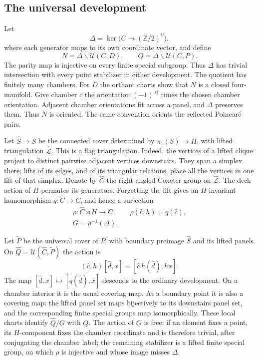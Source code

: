 \documentclass[11pt]{article}
\theoremstyle{definition}
\theoremstyle{remark}
\newcommand{\Z}{\mathbb Z}
\begin{document}
\subsection{The universal development}
\label{rf:universal}

Let
\[
 \Delta=\ker\bigl(C\longrightarrow(\Z/2)^V\bigr),
\]
where each generator maps to its own coordinate vector, and define
\[
 N=\Delta\backslash\mathcal U(C,D),\qquad
 Q=\Delta\backslash\mathcal U(C,P).
\]
The parity map is injective on every finite special subgroup.
Thus $\Delta$ has trivial intersection with every point stabilizer
in either development.  The quotient has finitely many chambers.
For $D$ the orthant charts show that $N$ is a closed four-manifold.
Give chamber $c$ the orientation $(-1)^{|c|}$ times the chosen chamber
orientation.  Adjacent chamber orientations fit across a panel, and
$\Delta$ preserves them.  Thus $N$ is oriented.  The same convention
orients the reflected Poincar\'e pairs.

Let $\widehat S\to S$ be the connected cover determined by
$\pi_1(S)\to H$, with lifted triangulation $\widehat{\mathcal L}$.
This is a flag triangulation.  Indeed, the vertices of a lifted clique
project to distinct pairwise adjacent vertices downstairs.  They span
a simplex there; lifts of its edges, and of its triangular relations,
place all the vertices in one lift of that simplex.  Denote by
$\widehat C$ the right-angled Coxeter group on
$\widehat{\mathcal L}$.  The deck action of $H$ permutes its generators.
Forgetting the lift gives an $H$-invariant homomorphism
$q:\widehat C\to C$, and hence a surjection
\begin{equation}
 \label{rf:group}
 \begin{gathered}
 \rho:\widehat C\rtimes H\longrightarrow C,
 \qquad \rho(\widehat c,h)=q(\widehat c),\\
 G=\rho^{-1}(\Delta).
 \end{gathered}
\end{equation}

Let $\widetilde P$ be the universal cover of $P$, with boundary
preimage $\widehat S$ and its lifted panels.  On
$\widehat Q=\mathcal U(\widehat C,\widetilde P)$ the action is
\[
 (\widehat c,h)[\widehat d,x]
     =[\widehat c\,h(\widehat d),hx].
\]
The map $[\widehat d,x]\mapsto[q(\widehat d),\overline x]$ descends
to the ordinary development.  On a chamber interior it is the usual
covering map.  At a boundary point it is also a covering map: the
lifted panel set maps bijectively to its downstairs panel set, and
the corresponding finite special groups map isomorphically.  These
local charts identify $\widehat Q/G$ with $Q$.  The action of $G$ is
free: if an element fixes a point, its $H$-component fixes the chamber
coordinate and is therefore trivial, after conjugating the chamber
label; the remaining stabilizer is a lifted finite special group,
on which $\rho$ is injective and whose image misses $\Delta$.
\end{document}

